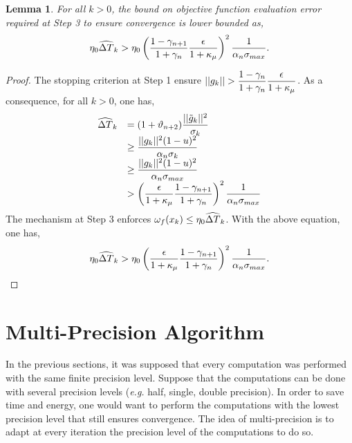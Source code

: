 \documentclass{article}[12pt]
\newtheorem{lemma}[]{Lemma}
\begin{document}
	\begin{lemma}
		For all $k>0$, the bound on objective function evaluation error required at Step 3 to ensure convergence is lower bounded as,
		\begin{equation}
			\eta_0 \widehat{\Delta T}_k > \eta_0 \left(\dfrac{1-\gamma_{n+1}}{1+\gamma_n}\dfrac{\epsilon}{1+\kappa_\mu}\right)^2\dfrac{1}{\alpha_n\sigma_{max}}.
		\end{equation}
	\end{lemma}
	\begin{proof}
		The stopping criterion at Step 1 ensure $||g_k|| > \dfrac{1-\gamma_{n}}{1+\gamma_n}\dfrac{\epsilon}{1+\kappa_\mu}$. As a consequence, for all $k>0$, one has,
		\begin{equation*}
			\begin{array}{ll}
				\widehat{\Delta T}_k & = (1+\vartheta_{n+2})\dfrac{||\tilde{g}_k||^2}{\sigma_k}\\
				& \geq \dfrac{||g_k||^2(1-u)^2}{\alpha_n\sigma_k}\\
				& \geq \dfrac{||g_k||^2(1-u)^2}{\alpha_n\sigma_{max}}\\
				& > \left(\dfrac{\epsilon}{1+\kappa_\mu}\dfrac{1-\gamma_{n+1}}{1+\gamma_n}\right)^2\dfrac{1}{\alpha_n\sigma_{max}}
			\end{array}
		\end{equation*}
		The mechanism at Step 3 enforces $\omega_f(x_k) \leq \eta_0 \widehat{\Delta T}_k$. With the above equation, one has,
		\begin{equation*}
			\eta_0 \widehat{\Delta T}_k > \eta_0 \left(\dfrac{\epsilon}{1+\kappa_\mu}\dfrac{1-\gamma_{n+1}}{1+\gamma_n}\right)^2\dfrac{1}{\alpha_n\sigma_{max}}.
		\end{equation*}
	\end{proof}

	
	

	\section{Multi-Precision Algorithm}
	
	
	In the previous sections, it was supposed that every computation was performed with the same finite precision level. Suppose that the computations can be done with several precision levels (\emph{e.g.} half, single, double precision). In order to save time and energy, one would want to perform the computations with the lowest precision level that still ensures convergence. The idea of multi-precision is to adapt at every iteration the precision level of the computations to do so.
	
\end{document}
